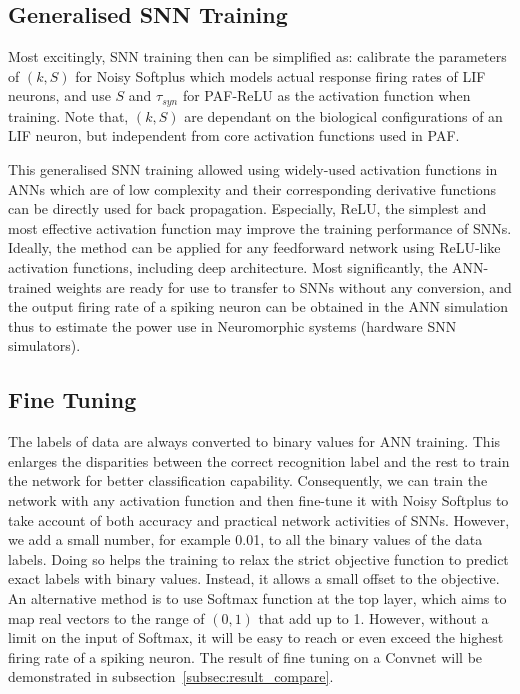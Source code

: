 \documentclass{article}
\begin{document}
\subsection{Generalised SNN Training}
\label{subsec:ns_train}
Most excitingly, SNN training then can be simplified as: calibrate the parameters of $(k, S)$ for Noisy Softplus which models actual response firing rates of LIF neurons, and use $S$ and $\tau_{syn}$ for PAF-ReLU as the activation function when training.
Note that, $(k, S)$ are dependant on the biological configurations of an LIF neuron, but independent from core activation functions used in PAF.

This generalised SNN training allowed using widely-used activation functions in ANNs which are of low complexity and their corresponding derivative functions can be directly used for back propagation.
Especially, ReLU, the simplest and most effective activation function may improve the training performance of SNNs.
Ideally, the method can be applied for any feedforward network using ReLU-like activation functions, including deep architecture.
Most significantly, the ANN-trained weights are ready for use to transfer to SNNs without any conversion, and the output firing rate of a spiking neuron can be obtained in the ANN simulation thus to estimate the power use in Neuromorphic systems (hardware SNN simulators).



\subsection{Fine Tuning}
The labels of data are always converted to binary values for ANN training.
This enlarges the disparities between the correct recognition label and the rest to train the network for better classification capability.
Consequently, we can train the network with any activation function and then fine-tune it with Noisy Softplus to take account of both accuracy and practical network activities of SNNs.
However, we add a small number, for example 0.01, to all the binary values of the data labels.
Doing so helps the training to relax the strict objective function to predict exact labels with binary values.
Instead, it allows a small offset to the objective.
An alternative method is to use Softmax function at the top layer, which aims to map real vectors to the range of $(0,1)$ that add up to 1. 
However, without a limit on the input of Softmax, it will be easy to reach or even exceed the highest firing rate of a spiking neuron.
The result of fine tuning on a Convnet will be demonstrated in subsection~\ref{subsec:result_compare}.
\end{document}
